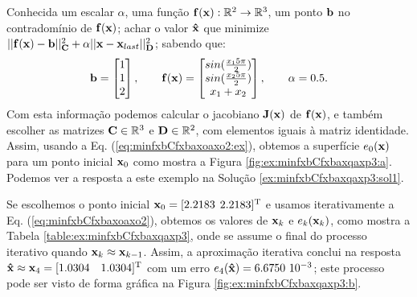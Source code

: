 \begin{example}
\label{ex:minfxbCfxbaxqaxp1}
Conhecida um escalar $\alpha$, uma função $\VECTOR{f}(\VECTOR{x}) : \mathbb{R}^{2} \rightarrow \mathbb{R}^{3}$,
um ponto $\VECTOR{b}$ no contradomínio de $\VECTOR{f}(\VECTOR{x})$;
achar o valor $\VECTOR{\hat{x}}$ que minimize 
$||\VECTOR{f}(\VECTOR{x})-\VECTOR{b}||_{\MATRIX{C}}^2+\alpha||\VECTOR{x}-\VECTOR{x}_{last}||_{\MATRIX{D}}^2$;
sabendo que:
\begin{equation}
\VECTOR{b}=\begin{bmatrix}
1\\
1\\
2
\end{bmatrix},
\qquad 
\VECTOR{f}(\VECTOR{x})=\begin{bmatrix}
sin(\frac{x_1 5 \pi}{2})\\
sin(\frac{x_2 5 \pi}{2})\\
x_1+x_2
\end{bmatrix},
\qquad
\alpha=0.5.
\end{equation}
Com esta informação podemos calcular o jacobiano $\MATRIX{J}(\VECTOR{x})$ de $\VECTOR{f}(\VECTOR{x})$,
 e também escolher as matrizes $\MATRIX{C} \in \mathbb{R}^{3}$ e $\MATRIX{D} \in \mathbb{R}^{2}$, 
com elementos iguais à  matriz identidade. 
Assim, usando a Eq. (\ref{eq:minfxbCfxbaxoaxo2:ex}),
obtemos a superfície $e_{0}(\VECTOR{x})$ para um ponto inicial $\VECTOR{x}_0$ como mostra a Figura \ref{fig:ex:minfxbCfxbaxqaxp3:a}.
Podemos ver a resposta a este exemplo na Solução \ref{ex:minfxbCfxbaxqaxp3:sol1}.
\end{example}

\begin{SolutionT}
\label{ex:minfxbCfxbaxqaxp3:sol1}
Se escolhemos o ponto inicial $\VECTOR{x}_0=[2.2183$ $2.2183]^{\mathrm{T}}$ e 
usamos iterativamente a Eq. (\ref{eq:minfxbCfxbaxoaxo2}), obtemos os valores 
de $\VECTOR{x}_k$ e $e_{k}(\VECTOR{x}_k)$, como mostra a Tabela \ref{table:ex:minfxbCfxbaxqaxp3},
onde se assume o final do processo iterativo quando $\VECTOR{x}_k \approx \VECTOR{x}_{k-1}$.
Assim, a aproximação iterativa conclui na resposta 
$\VECTOR{\hat{x}}\approx \VECTOR{x}_{4} =[1.0304\quad 1.0304]^{\transpose}$
com um erro $e_{4}(\VECTOR{\hat{x}})=6.6750~10^{-3}$;
este processo pode ser visto de forma gráfica na Figura \ref{fig:ex:minfxbCfxbaxqaxp3:b}.
\end{SolutionT}

